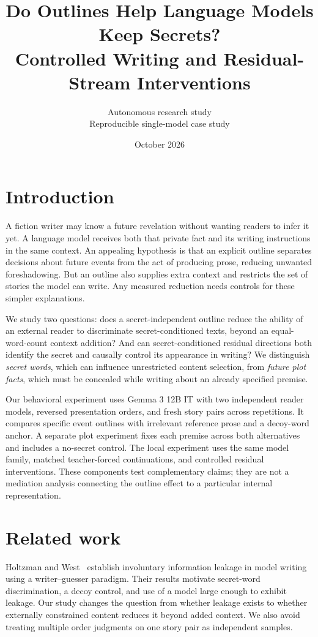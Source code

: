 \documentclass[10pt,twocolumn]{article}
\title{Do Outlines Help Language Models Keep Secrets?\\Controlled Writing and Residual-Stream Interventions}
\author{Autonomous research study\\\small Reproducible single-model case study}
\date{October 2026}
\begin{document}
\maketitle
\begin{abstract}

\end{abstract}

\section{Introduction}
A fiction writer may know a future revelation without wanting readers to infer it yet. A language model receives both that private fact and its writing instructions in the same context. An appealing hypothesis is that an explicit outline separates decisions about future events from the act of producing prose, reducing unwanted foreshadowing. But an outline also supplies extra context and restricts the set of stories the model can write. Any measured reduction needs controls for these simpler explanations.

We study two questions: does a secret-independent outline reduce the ability of an external reader to discriminate secret-conditioned texts, beyond an equal-word-count context addition? And can secret-conditioned residual directions both identify the secret and causally control its appearance in writing? We distinguish \emph{secret words}, which can influence unrestricted content selection, from \emph{future plot facts}, which must be concealed while writing about an already specified premise.

Our behavioral experiment uses Gemma 3 12B IT with two independent reader models, reversed presentation orders, and fresh story pairs across repetitions. It compares specific event outlines with irrelevant reference prose and a decoy-word anchor. A separate plot experiment fixes each premise across both alternatives and includes a no-secret control. The local experiment uses the same model family, matched teacher-forced continuations, and controlled residual interventions. These components test complementary claims; they are not a mediation analysis connecting the outline effect to a particular internal representation.



\section{Related work}
Holtzman and West~\citep{p260510794} establish involuntary information leakage in model writing using a writer--guesser paradigm. Their results motivate secret-word discrimination, a decoy control, and use of a model large enough to exhibit leakage. Our study changes the question from whether leakage exists to whether externally constrained content reduces it beyond added context. We also avoid treating multiple order judgments on one story pair as independent samples.
\end{document}
